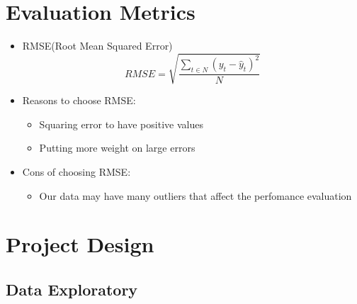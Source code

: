 \documentclass[11pt]{article}
\providecommand{\tightlist}{%
      \setlength{\itemsep}{0pt}\setlength{\parskip}{0pt}}
\begin{document}
\section{Evaluation Metrics}\label{evaluation-metrics}

\begin{itemize}
\tightlist
\item
  RMSE(Root Mean Squared Error)
  \[RMSE = \sqrt{\frac{\sum_{t \in N}(y_t - \hat{y}_t)^2}{N}}\]
\item
  Reasons to choose RMSE:

  \begin{itemize}
  \tightlist
  \item
    Squaring error to have positive values
  \item
    Putting more weight on large errors
  \end{itemize}
\item
  Cons of choosing RMSE:

  \begin{itemize}
  \tightlist
  \item
    Our data may have many outliers that affect the perfomance
    evaluation
  \end{itemize}
\end{itemize}

\section{Project Design}\label{project-design}

\subsection{Data Exploratory}\label{data-exploratory}
\end{document}

